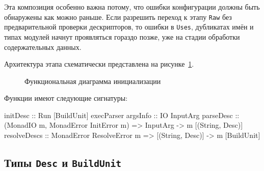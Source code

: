 \documentclass[a4paper,12pt]{article}
\begin{document}
Эта композиция особенно важна потому, что ошибки конфигурации должны быть обнаружены как
можно раньше. Если разрешить переход к этапу \texttt{Raw} без предварительной проверки
дескрипторов, то ошибки в \texttt{Uses}, дубликатах имён и типах модулей начнут
проявляться гораздо позже, уже на стадии обработки содержательных данных.

Архитектура этапа схематически представлена на рисунке~\ref{fig:Init}.

\begin{figure}[H]
\centering
{}
\caption{Функциональная диаграмма инициализации}
\label{fig:Init}
\end{figure}

Функции имеют следующие сигнатуры:
\begin{flushleft}
\label{lst:init-funcs}
\begin{MyCodes}
initDesc :: Run [BuildUnit]
execParser argsInfo :: IO InputArg
parseDesc :: (MonadIO m, MonadError InitError m)
          => InputArg -> m [(String, Desc)]
resolveDescs :: MonadError ResolveError m => [(String, Desc)] -> m [BuildUnit]
\end{MyCodes}
\end{flushleft}

\subsection{Типы \texttt{Desc} и \texttt{BuildUnit}}
\end{document}
